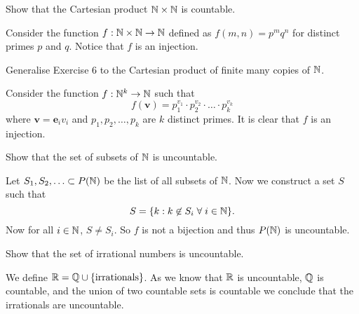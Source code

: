 \question Show that the Cartesian product $\mathbb{N} \times \mathbb{N}$ is countable.
\begin{solution}
    Consider the function $f: \mathbb{N} \times \mathbb{N} \to \mathbb{N}$ defined as $f(m,n) = p^mq^n$ for distinct primes $p$ and $q$. Notice that $f$ is an injection. 
\end{solution}

\question Generalise Exercise 6 to the Cartesian product of finite many copies of $\mathbb{N}$.
\begin{solution}
    Consider the function $f: \mathbb{N}^k \to \mathbb{N}$ such that
    \[ f(\bm v) = p_1^{v_1} \cdot p_2^{v_2} \cdot \ldots \cdot p_k^{v_k} \]
    where $\bm v = \bm e_i v_i$ and $p_1, p_2, \ldots, p_k$ are $k$ distinct primes. It is clear that  $f$ is an injection.
\end{solution}

\question Show that the set of subsets of $\mathbb{N}$ is uncountable.
\begin{solution}
    Let $S_1, S_2, \ldots \subset P(\mathbb{N})$ be the list of all subsets of $\mathbb{N}$. Now we construct a set $S$ such that
    \[ S = \{ k: k \not \in S_i \;\forall\; i \in \mathbb{N} \}. \]
    Now for all $i \in \mathbb{N}$, $S \neq S_i$. So $f$ is not a bijection and thus $P(\mathbb{N})$ is uncountable.
\end{solution}

\question Show that the set of irrational numbers is uncountable.
\begin{solution}
    We define $\mathbb{R} = \mathbb{Q} \cup \{\text{irrationals}\}$. As we know that $\mathbb{R}$ is uncountable, $\mathbb{Q}$ is countable, and the union of two countable sets is countable we conclude that the irrationals are uncountable.
\end{solution}
